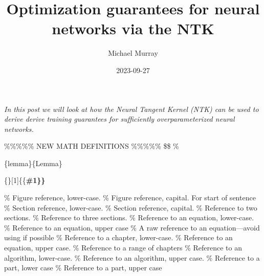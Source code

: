 \documentclass[
  letterpaper,
  DIV=11,
  numbers=noendperiod]{scrartcl}
\title{Optimization guarantees for neural networks via the NTK}
\author{Michael Murray}
\date{2023-09-27}
\begin{document}
\maketitle
\ifdefined\Shaded\renewenvironment{Shaded}{\begin{tcolorbox}[frame hidden, borderline west={3pt}{0pt}{shadecolor}, interior hidden, boxrule=0pt, enhanced, sharp corners, breakable]}{\end{tcolorbox}}\fi

\emph{In this post we will look at how the Neural Tangent Kernel (NTK)
can be used to derive derive training guarantees for sufficiently
overparameterized neural networks.}

\%\%\%\%\% NEW MATH DEFINITIONS \%\%\%\%\% \$\$ \%

\usepackage{amsmath,amsfonts,bm}

\newenvironment{definition}{Definition}
\newenvironment

\{lemma\}\{Lemma\}

\newenvironment{theorem}{Theorem}



\newcommand

\{\newterm\}{[}1{]}\{\{\bf \#1\}\}

\% Figure reference, lower-case. \def\figref#1{figure~\ref{#1}} \%
Figure reference, capital. For start of sentence
\def\Figref#1{Figure~\ref{#1}}
\def\twofigref#1#2{figures \ref{#1} and \ref{#2}}
\def\quadfigref#1#2#3#4{figures \ref{#1}, \ref{#2}, \ref{#3} and \ref{#4}}
\% Section reference, lower-case. \def\secref#1{section~\ref{#1}} \%
Section reference, capital. \def\Secref#1{Section~\ref{#1}} \% Reference
to two sections. \def\twosecrefs#1#2{sections \ref{#1} and \ref{#2}} \%
Reference to three sections.
\def\secrefs#1#2#3{sections \ref{#1}, \ref{#2} and \ref{#3}} \%
Reference to an equation, lower-case. \def\eqref#1{equation~\ref{#1}} \%
Reference to an equation, upper case \def\Eqref#1{Equation~\ref{#1}} \%
A raw reference to an equation---avoid using if possible
\def\plaineqref#1{\ref{#1}} \% Reference to a chapter, lower-case.
\def\chapref#1{chapter~\ref{#1}} \% Reference to an equation, upper
case. \def\Chapref#1{Chapter~\ref{#1}} \% Reference to a range of
chapters \def\rangechapref#1#2{chapters\ref{#1}--\ref{#2}} \% Reference
to an algorithm, lower-case. \def\algref#1{algorithm~\ref{#1}} \%
Reference to an algorithm, upper case. \def\Algref#1{Algorithm~\ref{#1}}
\def\twoalgref#1#2{algorithms \ref{#1} and \ref{#2}}
\def\Twoalgref#1#2{Algorithms \ref{#1} and \ref{#2}} \% Reference to a
part, lower case \def\partref#1{part~\ref{#1}} \% Reference to a part,
upper case \def\Partref#1{Part~\ref{#1}}
\def\twopartref#1#2{parts \ref{#1} and \ref{#2}}
\end{document}

